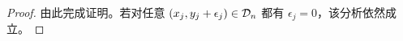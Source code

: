 \begin{proof}
\noindent 由此完成证明。若对任意 $\left(x_j,y_j+\epsilon_j\right)\in\mathcal{D}_n$ 都有 $\epsilon_j=0$，该分析依然成立。
\end{proof}